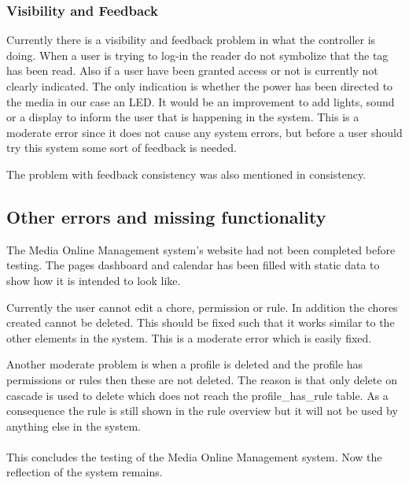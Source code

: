 \subsubsection{Visibility and Feedback}
Currently there is a visibility and feedback problem in what the controller is doing. When a user is trying to log-in the reader do not symbolize that the tag has been read. Also if a user have been granted access or not is currently not clearly indicated. The only indication is whether the power has been directed to the media in our case an LED. It would be an improvement to add lights, sound or a display to inform the user that is happening in the system. This is a moderate error since it does not cause any system errors, but before a user should try this system some sort of feedback is needed.

The problem with feedback consistency was also mentioned in consistency.    


\subsection{Other errors and missing functionality}
The Media Online Management system's website had not been completed before testing. The pages dashboard and calendar has been filled with static data to show how it is intended to look like. 

Currently the user cannot edit a chore, permission or rule. In addition the chores created cannot be deleted. This should be fixed such that it works similar to the other elements in the system. This is a moderate error which is easily fixed.

Another moderate problem is when a profile is deleted and the profile has permissions or rules then these are not deleted. The reason is that only delete on cascade is used to delete which does not reach the profile\_has\_rule table. As a consequence the rule is still shown in the rule overview but it will not be used by anything else in the system.\\\\

This concludes the testing of the Media Online Management system. Now the reflection of the system remains. 
